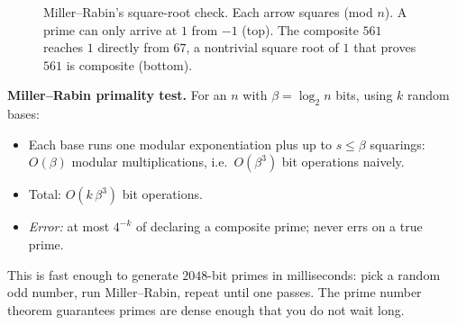 \begin{figure}[H]
\centering
{}
\caption{Miller--Rabin's square-root check. Each arrow squares (mod $n$). A
prime can only arrive at $1$ from $-1$ (top). The composite $561$ reaches $1$
directly from $67$, a nontrivial square root of $1$ that proves $561$ is composite (bottom).}
\label{ch30:fig-mr}
\end{figure}

\begin{complexitybox}
\textbf{Miller--Rabin primality test.} For an $n$ with $\beta = \log_2 n$ bits,
using $k$ random bases:
\begin{itemize}
  \item Each base runs one modular exponentiation plus up to $s \le \beta$
        squarings: $O(\beta)$ modular multiplications, i.e.\ $O(\beta^3)$ bit
        operations naively.
  \item Total: $O(k\,\beta^3)$ bit operations.
  \item \emph{Error:} at most $4^{-k}$ of declaring a composite prime; never
        errs on a true prime.
\end{itemize}
This is fast enough to generate $2048$-bit primes in milliseconds: pick a random
odd number, run Miller--Rabin, repeat until one passes. The prime number theorem
guarantees primes are dense enough that you do not wait long.
\end{complexitybox}

